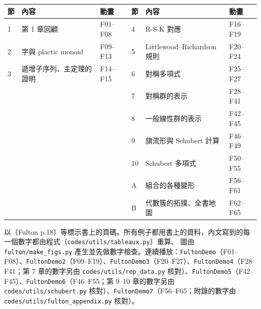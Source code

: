 \documentclass[11pt,a4paper]{article}
\begin{document}
\setcounter{tocdepth}{1}
\begingroup
\setlength{\parskip}{0pt}
\tableofcontents
\endgroup

\begin{center}
\small
\begin{tabular}{@{}lll@{\qquad}lll@{}}
\toprule
節 & 內容 & 動畫 & 節 & 內容 & 動畫\\
\midrule
1 & 第 1 章回顧 & F01--F08 & 4 & R-S-K 對應 & F16--F19\\
2 & 字與 plactic monoid & F09--F13 & 5 & Littlewood–Richardson 規則 & F20--F24\\
3 & 遞增子序列、主定理的證明 & F14--F15 & 6 & 對稱多項式 & F25--F27\\
 & & & 7 & 對稱群的表示 & F28--F41\\
 & & & 8 & 一般線性群的表示 & F42--F45\\
 & & & 9 & 旗流形與 Schubert 計算 & F46--F49\\
 & & & 10 & Schubert 多項式 & F50--F55\\
 & & & A & 組合的各種變形 & F56--F61\\
 & & & B & 代數簇的拓撲、全書地圖 & F62--F65\\
\bottomrule
\end{tabular}
\end{center}

\noindent 以〔Fulton p.18〕等標示書上的頁碼。所有例子都用書上的資料，內文寫到的每一個數字都由程式（\texttt{codes/utils/tableaux.py}）重算、
圖由 \texttt{fulton/make\_figs.py} 產生並先做數字檢查。連續播放：\texttt{FultonDemo}（F01--F08）、\texttt{FultonDemo2}（F09--F19）、\texttt{FultonDemo3}（F20--F27）、\texttt{FultonDemo4}（F28--F41；第 7 章的數字另由 \texttt{codes/utils/rep\_data.py} 核對）、\texttt{FultonDemo5}（F42--F45）、\texttt{FultonDemo6}（F46--F55；第 9--10 章的數字另由 \texttt{codes/utils/schubert.py} 核對）、\texttt{FultonDemo7}（F56--F65；附錄的數字由 \texttt{codes/utils/fulton\_appendix.py} 核對）。









\appendix


\end{document}
